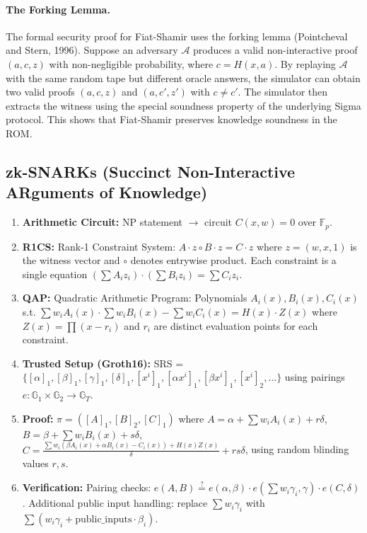 \paragraph{The Forking Lemma.} The formal security proof for Fiat-Shamir uses the forking lemma (Pointcheval and Stern, 1996). Suppose an adversary $\mathcal{A}$ produces a valid non-interactive proof $(a, c, z)$ with non-negligible probability, where $c = H(x, a)$. By replaying $\mathcal{A}$ with the same random tape but different oracle answers, the simulator can obtain two valid proofs $(a, c, z)$ and $(a, c', z')$ with $c \neq c'$. The simulator then extracts the witness using the special soundness property of the underlying Sigma protocol. This shows that Fiat-Shamir preserves knowledge soundness in the ROM.

\subsection{zk-SNARKs (Succinct Non-Interactive ARguments of Knowledge)}
\label{sec:zk:snark}

\begin{enumerate}
\item \textbf{Arithmetic Circuit:} NP statement $\to$ circuit $C(x,w)=0$ over $\mathbb{F}_p$.
\item \textbf{R1CS:} Rank-1 Constraint System: $A \cdot z \circ B \cdot z = C \cdot z$ where $z = (w, x, 1)$ is the witness vector and $\circ$ denotes entrywise product. Each constraint is a single equation $(\sum A_i z_i) \cdot (\sum B_i z_i) = \sum C_i z_i$.
\item \textbf{QAP:} Quadratic Arithmetic Program: Polynomials $A_i(x), B_i(x), C_i(x)$ s.t. $\sum w_i A_i(x) \cdot \sum w_i B_i(x) - \sum w_i C_i(x) = H(x) \cdot Z(x)$ where $Z(x) = \prod (x - r_i)$ and $r_i$ are distinct evaluation points for each constraint.
\item \textbf{Trusted Setup (Groth16):} SRS = $\{ [\alpha]_1, [\beta]_1, [\gamma]_1, [\delta]_1, [x^i]_1, [\alpha x^i]_1, [\beta x^i]_1, [x^i]_2, \dots \}$ using pairings $e: \mathbb{G}_1 \times \mathbb{G}_2 \to \mathbb{G}_T$.
\item \textbf{Proof:} $\pi = ([A]_1, [B]_2, [C]_1)$ where $A = \alpha + \sum w_i A_i(x) + r \delta$, $B = \beta + \sum w_i B_i(x) + s \delta$, $C = \frac{\sum w_i (\beta A_i(x) + \alpha B_i(x) - C_i(x)) + H(x)Z(x)}{\delta} + r s \delta$, using random blinding values $r, s$.
\item \textbf{Verification:} Pairing checks: $e(A,B) \stackrel{?}{=} e(\alpha,\beta) \cdot e(\sum w_i \gamma_i, \gamma) \cdot e(C,\delta)$. Additional public input handling: replace $\sum w_i \gamma_i$ with $\sum (w_i \gamma_i + \text{public\_inputs}\cdot \beta_i)$.
\end{enumerate}

